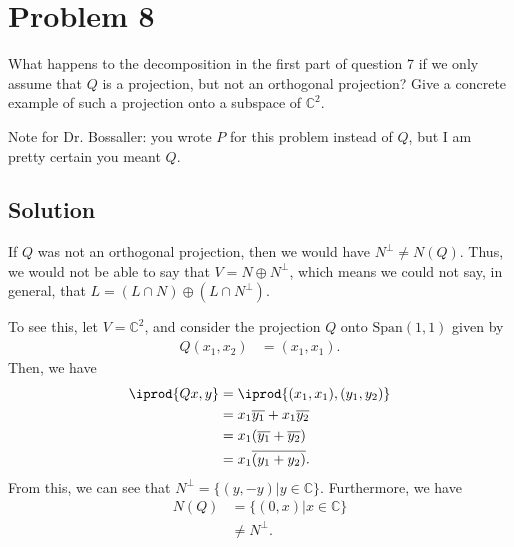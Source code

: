 \documentclass[10pt,a4paper]{article}
\theoremstyle{definition}
\begin{document}
\section*{Problem 8}
What happens to the decomposition in the first part of question 7 if we only assume that $Q$ is a projection, but not an orthogonal projection? Give a concrete example of such a projection onto a subspace of $\mathbb{C}^2$.

Note for Dr. Bossaller: you wrote $P$ for this problem instead of $Q$, but I am pretty certain you meant $Q$.

\subsection*{Solution}
If $Q$ was not an orthogonal projection, then we would have $N^\perp \not = N(Q)$. Thus, we would not be able to say that $V = N \oplus N^\perp$, which means we could not say, in general, that $L = (L \cap N) \oplus (L \cap N^\perp)$.

To see this, let $V = \mathbb{C}^2$, and consider the projection $Q$ onto $\text{Span}(1,1)$ given by 
\begin{align*}
Q (x_1, x_2) &= (x_1, x_1).
\end{align*}
Then, we have
\begin{align*}
\iprod{Qx, y} &= \iprod{(x_1, x_1), (y_1, y_2)}\\
&= x_1 \overline{y_1} + x_1 \overline{y_2}\\
&= x_1 (\overline{y_1} + \overline{y_2})\\
&= x_1 \overline{(y_1 + y_2)}.
\end{align*}
From this, we can see that $N^\perp = \{(y, -y) | y \in \mathbb{C} \}$. Furthermore, we have
\begin{align*}
N(Q) &= \{(0, x)| x \in \mathbb{C} \}\\
&\not = N^\perp.
\end{align*}
\end{document}
